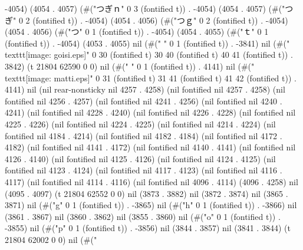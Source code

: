 -4054) (4054 . 4057) (#("つぎｎ" 0 3 (fontified t)) . -4054) (4054 . 4057) (#("つぎ" 0 2 (fontified t)) . -4054) (4054 . 4056) (#("つｇ" 0 2 (fontified t)) . -4054) (4054 . 4056) (#("つ" 0 1 (fontified t)) . -4054) (4054 . 4055) (#("ｔ" 0 1 (fontified t)) . -4054) (4053 . 4055) nil (#("
" 0 1 (fontified t)) . -3841) nil (#("  \\texttt{[image: goisi.eps]}" 0 30 (fontified t) 30 40 (fontified t) 40 41 (fontified t)) . 3842) (t 21804 62590 0 0) nil (#("
" 0 1 (fontified t)) . 4141) nil (#("  \\texttt{[image: matti.eps]}" 0 31 (fontified t) 31 41 (fontified t) 41 42 (fontified t)) . 4141) nil (nil rear-nonsticky nil 4257 . 4258) (nil fontified nil 4257 . 4258) (nil fontified nil 4256 . 4257) (nil fontified nil 4241 . 4256) (nil fontified nil 4240 . 4241) (nil fontified nil 4228 . 4240) (nil fontified nil 4226 . 4228) (nil fontified nil 4225 . 4226) (nil fontified nil 4224 . 4225) (nil fontified nil 4214 . 4224) (nil fontified nil 4184 . 4214) (nil fontified nil 4182 . 4184) (nil fontified nil 4172 . 4182) (nil fontified nil 4141 . 4172) (nil fontified nil 4140 . 4141) (nil fontified nil 4126 . 4140) (nil fontified nil 4125 . 4126) (nil fontified nil 4124 . 4125) (nil fontified nil 4123 . 4124) (nil fontified nil 4117 . 4123) (nil fontified nil 4116 . 4117) (nil fontified nil 4114 . 4116) (nil fontified nil 4096 . 4114) (4096 . 4258) nil (4095 . 4097) (t 21804 62552 0 0) nil (3873 . 3882) nil (3872 . 3874) nil (3865 . 3871) nil (#("g" 0 1 (fontified t)) . -3865) nil (#("h" 0 1 (fontified t)) . -3866) nil (3861 . 3867) nil (3860 . 3862) nil (3855 . 3860) nil (#("o" 0 1 (fontified t)) . -3855) nil (#("p" 0 1 (fontified t)) . -3856) nil (3844 . 3857) nil (3841 . 3844) (t 21804 62002 0 0) nil (#("%